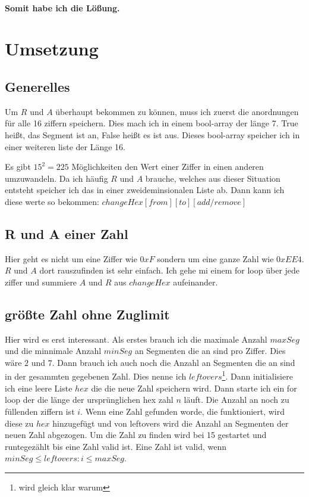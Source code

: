 \documentclass[a4paper,10pt,ngerman]{scrartcl}
\begin{document}
\paragraph{Somit habe ich die Lößung.}

\section{Umsetzung}

\subsection{Generelles}

Um $R$ und $A$ überhaupt bekommen zu können, muss ich zuerst die anordnungen für alle 16 ziffern speichern. Dies mach ich in einem bool-array der länge 7. True heißt, das Segment ist an, False heißt es ist aus. Dieses bool-array speicher ich in einer weiteren liste der Länge 16.

Es gibt $15^2 = 225$ Möglichkeiten den Wert einer Ziffer in einen anderen umzuwandeln. Da ich häufig $R$ und $A$ brauche, welches aus dieser Situation entsteht speicher ich das in einer zweideminsionalen Liste ab. Dann kann ich diese werte so bekommen: $changeHex[from][to][add/remove]$

\subsection{R und A einer Zahl}

Hier geht es nicht um eine Ziffer wie $0xF$ sondern um eine ganze Zahl wie $0xEE4$. $R$ und $A$ dort rauszufinden ist sehr einfach. Ich gehe mi einem for loop über jede ziffer und summiere $A$ und $R$ aus $changeHex$ aufeinander.

\subsection{größte Zahl ohne Zuglimit}

Hier wird es erst interessant. Als erstes brauch ich die maximale Anzahl $maxSeg$ und die minnimale Anzahl $minSeg$ an Segmenten die an sind pro Ziffer. Dies wäre $2$ und $7$. Dann brauch ich auch noch die Anzahl an Segmenten die an sind in der gesammten gegebenen Zahl. Dies nenne ich $leftovers$\footnote{wird gleich klar warum}. Dann initialisiere ich eine leere Liste $hex$ die die neue Zahl speichern wird. Dann starte ich ein for loop der die länge der ursprünglichen hex zahl $n$ läuft. Die Anzahl an noch zu füllenden ziffern ist $i$. Wenn eine Zahl gefunden worde, die funktioniert, wird diese zu $hex$ hinzugefügt und von leftovers wird die Anzahl an Segmenten der neuen Zahl abgezogen. Um die Zahl zu finden wird bei 15 gestartet und runtegezählt bis eine Zahl valid ist. Eine Zahl ist valid, wenn $minSeg \leq leftovers : i \leq maxSeg$.
\end{document}
